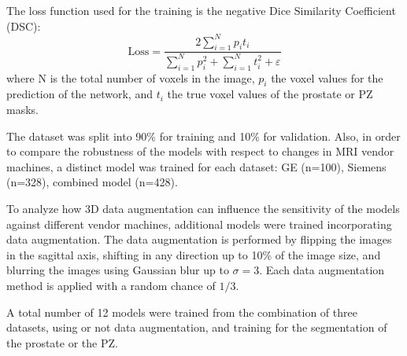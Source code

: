 The loss function used for the training is the negative Dice Similarity Coefficient (DSC):
\begin{equation}
\text{Loss} = \frac{2 \sum_{i=1}^{N}p_it_i}{\sum_{i=1}^{N}p_i^2 + \sum_{i=1}^{N}t_i^2 + \varepsilon} 
\label{eq:dsc}
\end{equation}
where N is the total number of voxels in the image, $p_i$ the voxel values for the 
prediction of the network, and $t_i$ the true voxel values of the prostate or PZ masks.

The dataset was split into 90\% for training and 10\% for
validation. Also, in order to compare the robustness of the models with respect to changes
in MRI vendor machines,  a distinct model was trained for each dataset: GE (n=100), 
Siemens (n=328), combined model (n=428). 

To analyze how 3D data augmentation can influence the sensitivity of the models
against different vendor machines, additional models were trained 
incorporating data augmentation. The data augmentation is performed by flipping the
images in the sagittal axis,  shifting in any direction up to 10\% of the image size, and
blurring the images using Gaussian blur up to $\sigma = 3$. Each data augmentation
method is applied with a random chance of $1/3$.

A total number of 12 models were trained from the combination of 
three datasets, using or not data augmentation, and training for the segmentation 
of the prostate or the PZ. 
